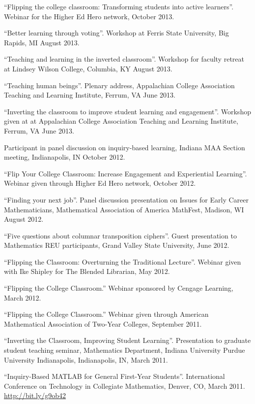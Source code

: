 \documentclass[letterpaper]{article}
\renewenvironment{itemize}{
  \begin{list}{}{
    \setlength{\leftmargin}{1.5em}
	\setlength{\itemsep}{0in}
  }
}{
  \end{list}
}
\begin{document}
\begin{itemize}
	\item ``Flipping the college classroom: Transforming students into active learners''. Webinar for the Higher Ed Hero network, October 2013.
	\item ``Better learning through voting''. Workshop at Ferris State University, Big Rapids, MI August 2013.
	\item ``Teaching and learning in the inverted classroom''. Workshop for faculty retreat at Lindsey Wilson College, Columbia, KY August 2013.
	\item ``Teaching human beings''. Plenary address, Appalachian College Association Teaching and Learning Institute, Ferrum, VA June 2013.
	\item ``Inverting the classroom to improve student learning and engagement''. Workshop given at at Appalachian College Association Teaching and Learning Institute, Ferrum, VA June 2013.
	\item Participant in panel discussion on inquiry-based learning, Indiana MAA Section meeting, Indianapolis, IN October 2012.
	\item ``Flip Your College Classroom: Increase Engagement and Experiential Learning''. Webinar given through Higher Ed Hero network, October 2012.
	\item ``Finding your next job''. Panel discussion presentation on Issues for Early Career Mathematicians, Mathematical Association of America MathFest, Madison, WI August 2012.
	\item ``Five questions about columnar transposition ciphers''. Guest presentation to Mathematics REU participants, Grand Valley State University, June 2012.
	\item ``Flipping the Classroom: Overturning the Traditional Lecture''. Webinar given with Ike Shipley for The Blended Librarian, May 2012.
	\item ``Flipping the College Classroom.'' Webinar sponsored by Cengage Learning, March 2012.
	\item ``Flipping the College Classroom.'' Webinar given through American Mathematical Association of Two-Year Colleges, September 2011.
	\item  ``Inverting the Classroom, Improving Student Learning''. Presentation to graduate student teaching seminar, Mathematics Department, Indiana University Purdue University Indianapolis, Indianapolis, IN, March 2011.
	\item ``Inquiry-Based MATLAB for General First-Year Students''. International Conference on Technology in Collegiate Mathematics, Denver, CO, March 2011. \url{http://bit.ly/g9ob42}

\end{itemize}
\end{document}
